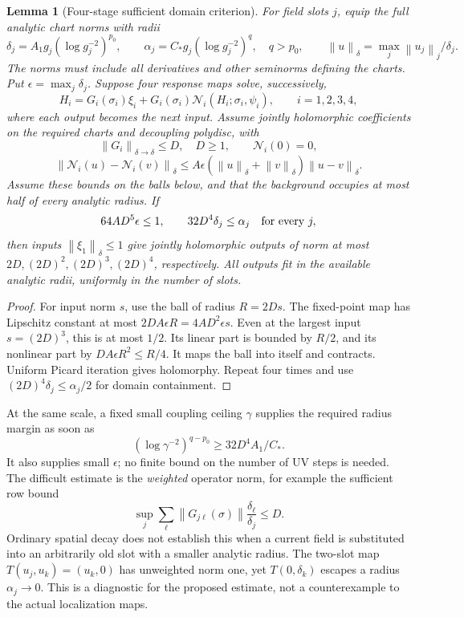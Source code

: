 \documentclass[11pt]{article}
\newtheorem{lemma}[proposition]{Lemma}
\theoremstyle{remark}
\newcommand{\norm}[1]{\left\|#1\right\|}
\begin{document}
\begin{lemma}[Four-stage sufficient domain criterion]
For field slots $j$, equip the full analytic chart norms with radii
\[
 \delta_j=A_1g_j(\log g_j^{-2})^{p_0},\qquad
 \alpha_j=C_*g_j(\log g_j^{-2})^q,\quad q>p_0,
 \qquad \norm u_\delta=\max_j\norm{u_j}_j/\delta_j.
\]
The norms must include all derivatives and other seminorms defining the
charts. Put $\epsilon=\max_j\delta_j$. Suppose four response maps
solve, successively,
\[
 H_i=G_i(\sigma_i)\xi_i+
       G_i(\sigma_i)\mathcal N_i(H_i;\sigma_i,\psi_i),
       \qquad i=1,2,3,4,
\]
where each output becomes the next input. Assume jointly holomorphic
coefficients on the required charts and decoupling polydisc, with
\[
 \norm{G_i}_{\delta\to\delta}\leq D,\quad D\geq1,
 \qquad \mathcal N_i(0)=0,
\]
\[
 \norm{\mathcal N_i(u)-\mathcal N_i(v)}_\delta
 \leq A\epsilon(\norm u_\delta+\norm v_\delta)\norm{u-v}_\delta.
\]
Assume these bounds on the balls below, and that the background occupies
at most half of every analytic radius. If
\[
 64AD^5\epsilon\leq1,\qquad
 32D^4\delta_j\leq\alpha_j\quad\hbox{for every }j,
\]
then inputs $\norm{\xi_1}_\delta\leq1$ give jointly holomorphic outputs
of norm at most $2D,(2D)^2,(2D)^3,(2D)^4$, respectively. All outputs fit in
the available analytic radii, uniformly in the number of slots.
\end{lemma}
\begin{proof}
For input norm $s$, use the ball of radius $R=2Ds$.
The fixed-point map has Lipschitz constant at most
$2DA\epsilon R=4AD^2\epsilon s$. Even at the largest input
$s=(2D)^3$, this is at most $1/2$.
Its linear part is bounded by $R/2$, and its nonlinear part by
$DA\epsilon R^2\leq R/4$. It maps the ball into itself and contracts.
Uniform Picard iteration gives holomorphy. Repeat four times and use
$(2D)^4\delta_j\leq\alpha_j/2$ for domain containment.
\end{proof}

At the same scale, a fixed small coupling ceiling $\gamma$ supplies
the required radius margin as soon as
\[
 (\log\gamma^{-2})^{q-p_0}\geq32D^4A_1/C_*.
\]
It also supplies small $\epsilon$; no finite bound on the number of UV
steps is needed. The difficult estimate is the \emph{weighted} operator
norm, for example the sufficient row bound
\[
 \sup_j\sum_\ell\norm{G_{j\ell}(\sigma)}
             \frac{\delta_\ell}{\delta_j}\leq D.
\]
Ordinary spatial decay does not establish this when a current field is
substituted into an arbitrarily old slot with a smaller analytic radius.
The two-slot map $T(u_j,u_k)=(u_k,0)$ has unweighted norm one, yet
$T(0,\delta_k)$ escapes a radius $\alpha_j\to0$.
This is a diagnostic for the proposed estimate, not a counterexample
to the actual localization maps.
\end{document}
